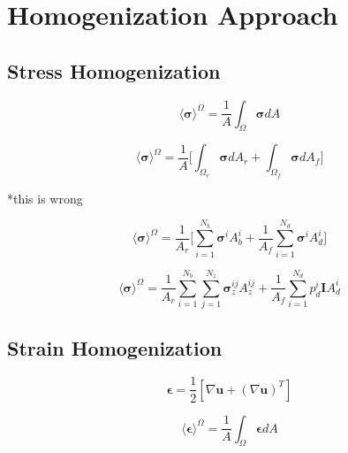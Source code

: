 \section{Homogenization Approach}

\subsection{Stress Homogenization}

\begin{equation}
\label{eqn:stress1}
\langle \boldsymbol{\sigma} \rangle^\Omega = 
\frac{1}{A} \int_\Omega \boldsymbol{\sigma} { dA}
\end{equation}

\begin{equation}
\label{eqn:stress2}
\langle \boldsymbol{\sigma} \rangle^\Omega = 
\frac{1}{A} \bigg \lbrack {\int_{\Omega_{r}} \boldsymbol{\sigma} { dA_r} + 
\int_{\Omega_{f}} \boldsymbol{\sigma} { dA_f}} \bigg \rbrack
\end{equation}

*this is wrong

\begin{equation}
\label{eqn:stress3}
\langle \boldsymbol{\sigma} \rangle^\Omega = 
\frac{1}{A_{r}} \bigg \lbrack \sum_{i=1}^{N_{b}} \boldsymbol{\sigma}^{i} A_{b}^{i} + 
\frac{1}{A_{f}} \sum_{i=1}^{N_{d}} \boldsymbol{\sigma}^{i} A_{d}^{i} \bigg \rbrack
\end{equation}

\begin{equation}
\label{eqn:stress4}
\langle \boldsymbol{\sigma} \rangle^\Omega = 
\frac{1}{A_{r}} \sum_{i=1}^{N_{b}} \sum_{j=1}^{N_{z}} \boldsymbol{\sigma}_z^{ij} A_{z}^{ij} + 
\frac{1}{A_{f}} \sum_{i=1}^{N_{d}} p_d^{i} \textbf{I} A_{d}^{i}
\end{equation}

\subsection{Strain Homogenization}

\begin{equation}
\label{eqn:strain1}
\boldsymbol{\epsilon} = 
\frac{1}{2}  \left[ \nabla \mathbf{u} + \left( \nabla \mathbf{u} \right)^{T} \right]
\end{equation}

\begin{equation}
\label{eqn:strain2}
\langle \boldsymbol{\epsilon} \rangle^\Omega = 
\frac{1}{A} \int_\Omega \boldsymbol{\epsilon} { dA}
\end{equation}

